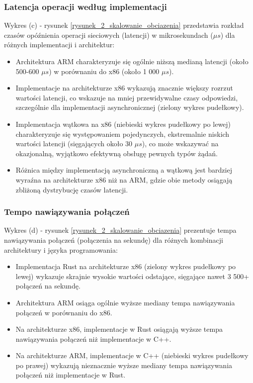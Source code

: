 \subsubsection{Latencja operacji według implementacji}
Wykres (c) - rysunek \ref{rysunek_2_skalowanie_obciazenia} przedstawia rozkład czasów opóźnienia operacji sieciowych (latencji) w mikrosekundach ($\mu s$) dla różnych implementacji i architektur:
\begin{itemize}
    \item Architektura ARM charakteryzuje się ogólnie niższą medianą latencji (około 500-600 $\mu s$) w porównaniu do x86 (około 1 000 $\mu s$).
    \item Implementacje na architekturze x86 wykazują znacznie większy rozrzut wartości latencji, co wskazuje na mniej przewidywalne czasy odpowiedzi, szczególnie dla implementacji asynchronicznej (zielony wykres pudełkowy).
    \item Implementacja wątkowa na x86 (niebieski wykres pudełkowy po lewej) charakteryzuje się występowaniem pojedynczych, ekstremalnie niskich wartości latencji (sięgających około 30 $\mu s$), co może wskazywać na okazjonalną, wyjątkowo efektywną obsługę pewnych typów żądań.
    \item Różnica między implementacją asynchroniczną a wątkową jest bardziej wyraźna na architekturze x86 niż na ARM, gdzie obie metody osiągają zbliżoną dystrybucję czasów latencji.
\end{itemize}

\subsubsection{Tempo nawiązywania połączeń}
Wykres (d) - rysunek \ref{rysunek_2_skalowanie_obciazenia} prezentuje tempa nawiązywania połączeń (połączenia na sekundę) dla różnych kombinacji architektury i języka programowania:
\begin{itemize}
    \item Implementacja Rust na architekturze x86 (zielony wykres pudełkowy po lewej) wykazuje skrajnie wysokie wartości odstające, sięgające nawet 3 500+ połączeń na sekundę.
    \item Architektura ARM osiąga ogólnie wyższe mediany tempa nawiązywania połączeń w porównaniu do x86.
    \item Na architekturze x86, implementacje w Rust osiągają wyższe tempa nawiązywania połączeń niż implementacje w C++.
    \item Na architekturze ARM, implementacje w C++ (niebieski wykres pudełkowy po prawej) wykazują nieznacznie wyższe mediany tempa nawiązywania połączeń niż implementacje w Rust.
\end{itemize}

